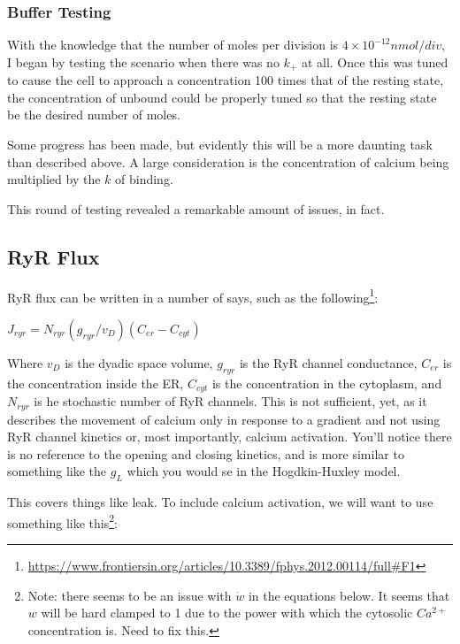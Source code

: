\documentclass[12pt]{amsart}
\begin{document}
\subsubsection{Buffer Testing} With the knowledge that the number of moles per division is $4\times10^{-12} nmol/div
$, I began by testing the scenario when there was no $k_+$ at all. Once this was tuned to cause the cell to approach a concentration 100 times that of the resting state, the concentration of unbound could be properly tuned so that the resting state be the desired number of moles.\newline

Some progress has been made, but evidently this will be a more daunting task than described above. A large consideration is the concentration of calcium being multiplied by the $k$ of binding.\newline

This round of testing revealed a remarkable amount of issues, in fact.


\subsection{RyR Flux} RyR flux can be written in a number of says, such as the following\footnote{\url{https://www.frontiersin.org/articles/10.3389/fphys.2012.00114/full\#F1}}: 

\bigskip

\begin{center}

    $J_{ryr} = N_{ryr}(g_{ryr}/v_D)(C_{er} - C_{cyt})$
    
\end{center}

\bigskip

Where $v_D$ is the dyadic space volume, $g_{ryr}$ is the RyR channel conductance, $C_{er}$ is the concentration inside the ER, $C_{cyt}$ is the concentration in the cytoplasm, and $N_{ryr}$ is he stochastic number of RyR channels. This is not sufficient, yet, as it describes the movement of calcium only in response to a gradient and not using RyR channel kinetics or, most importantly, calcium activation. You'll notice there is no reference to the opening and closing kinetics, and is more similar to something like the $g_L$ which you would se in the Hogdkin-Huxley model.\newline

This covers things like leak. To include calcium activation, we will want to use something like this\footnote{Note: there seems to be an issue with $\dot{w}$ in the equations below. It seems that $w$ will be hard clamped to 1 due to the power with which the cytosolic $Ca^{2+}$ concentration is. Need to fix this.}: 
\end{document}
